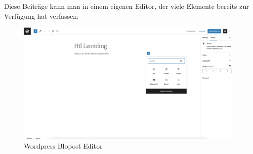 Diese Beiträge kann man in einem eigenen Editor, der viele Elemente bereits zur Verfügung hat verfassen:

\begin{figure}[hbt!]
    \centering
    \includegraphics[scale=0.2]{pics/blogpost}
    \caption{Wordpress Blopost Editor}
    \label{fig:impl:blogpost}
\end{figure}
